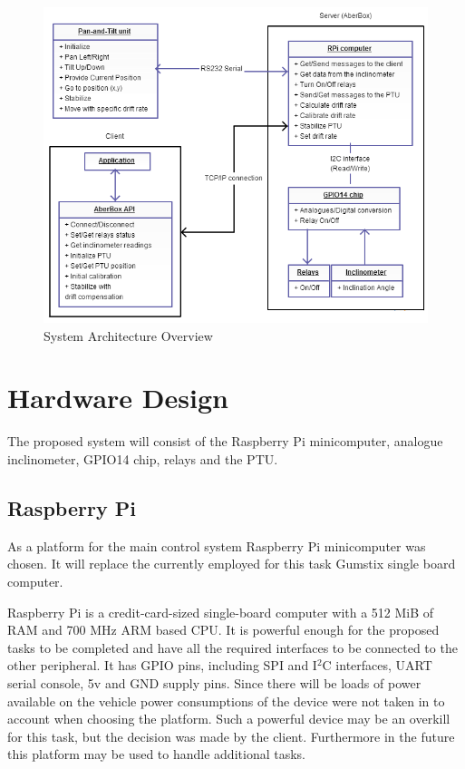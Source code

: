 \begin{figure}[H]
\centering
\centerline{\includegraphics[scale=0.80]{./images/SystemArchitectureOverview}}
\caption{System Architecture Overview}
\label{fig:SystemArchitectureOverview}
\end{figure}

\section{Hardware Design}
The proposed system will consist of the Raspberry Pi minicomputer, analogue inclinometer, GPIO14 chip, relays and the PTU.

\subsection{Raspberry Pi}
As a platform for the main control system Raspberry Pi minicomputer was chosen. It will replace the currently employed for this task Gumstix single board computer. 

Raspberry Pi is a credit-card-sized single-board computer with a 512 MiB of RAM and 700 MHz ARM based CPU. It is powerful enough for the proposed tasks to be completed and have all the required interfaces to be connected to the other peripheral. It has GPIO pins, including SPI and I$^2$C interfaces, UART serial console, 5v and GND supply pins. Since there will be loads of power available on the vehicle power consumptions of the device were not taken in to account when choosing the platform. Such a powerful device may be an overkill for this task, but the decision was made by the client. Furthermore in the future this platform may be used to handle additional tasks.

